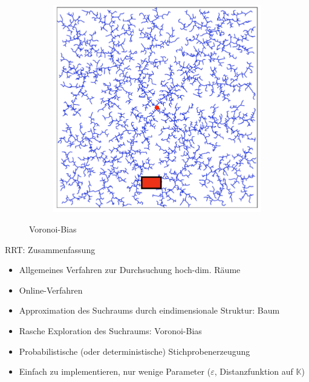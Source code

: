 \begin{figure}[h!]
\begin{subfigure}{.3\textwidth}
	\end{subfigure}
	\begin{subfigure}{.3\textwidth}
		\includegraphics[width=\textwidth]{figures/ch04_voron6.png}
	\end{subfigure}
	\caption{Voronoi-Bias}
	\label{fig:vb1}
\end{figure}
RRT: Zusammenfassung
\begin{itemize}
\item Allgemeines Verfahren zur Durchsuchung hoch-dim. Räume
\item Online-Verfahren
\item Approximation des Suchraums durch eindimensionale Struktur: Baum
\item Rasche Exploration des Suchraums: Voronoi-Bias
\item Probabilistische (oder deterministische) Stichprobenerzeugung
\item Einfach zu implementieren, nur wenige Parameter ($\varepsilon$, Distanzfunktion auf $\mathbb{K}$)
\end{itemize}
